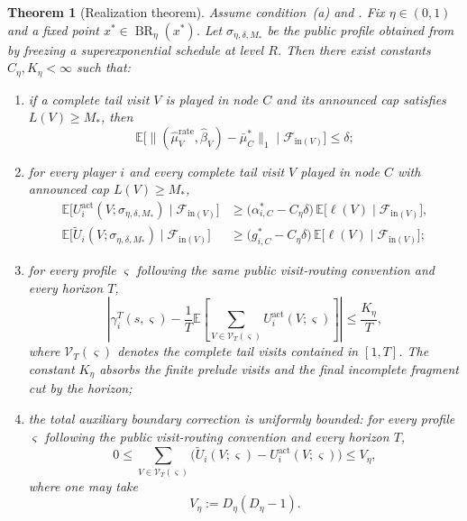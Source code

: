 \documentclass[12pt]{article}
\newtheorem{theorem}{Theorem}[section]
\theoremstyle{definition}
\newcommand{\E}{\mathbb{E}}
\newcommand{\1}{\mathbf{1}}
\newcommand{\cF}{\mathcal{F}}
\DeclareMathOperator{\BR}{BR}
\begin{document}
\begin{theorem}[Realization theorem]
\label{thm:realization}
Assume condition~\textnormal{(a)} and . Fix
$\eta\in(0,1)$ and a fixed point $x^*\in\BR_\eta(x^*)$. Let
$\sigma_{\eta,\delta,M_*}$ be the public profile obtained from
 by freezing a superexponential schedule at level $R$.
Then there exist constants $C_\eta,K_\eta<\infty$ such that:
\begin{enumerate}[label=\textnormal{(Q\arabic*)},leftmargin=2.8em]
\item if a complete tail visit $V$ is played in node $C$ and its announced cap
satisfies $L(V)\ge M_*$, then
\begin{equation}
\label{eq:visit-occupation-realization}
\E\bigl[\|(\widehat\mu_V^{\mathrm{rate}},\widehat\beta_V)-\bar\mu_C^*\|_1
\mid \cF_{\mathrm{in}(V)}\bigr]
\le \delta;
\end{equation}
\item for every player $i$ and every complete tail visit $V$ played in node $C$
with announced cap $L(V)\ge M_*$,
\begin{align}
\label{eq:visit-actual-realization}
\E\bigl[U_i^{\mathrm{act}}(V;\sigma_{\eta,\delta,M_*})\mid \cF_{\mathrm{in}(V)}\bigr]
&\ge
\bigl(\alpha_{i,C}^*-C_\eta\delta\bigr)\,
\E\bigl[\ell(V)\mid \cF_{\mathrm{in}(V)}\bigr],
\\
\label{eq:visit-aux-realization}
\E\bigl[\widetilde U_i(V;\sigma_{\eta,\delta,M_*})\mid \cF_{\mathrm{in}(V)}\bigr]
&\ge
\bigl(g_{i,C}^*-C_\eta\delta\bigr)\,
\E\bigl[\ell(V)\mid \cF_{\mathrm{in}(V)}\bigr];
\end{align}
\item for every profile $\varsigma$ following the same public visit-routing
convention and every horizon $T$,
\begin{equation}
\label{eq:realization-actual-tail-bound}
\left|
\gamma_i^T(s,\varsigma)
-
\frac1T\E\left[
\sum_{V\in\mathcal V_T(\varsigma)}
U_i^{\mathrm{act}}(V;\varsigma)
\right]
\right|
\le \frac{K_\eta}{T},
\end{equation}
where $\mathcal V_T(\varsigma)$ denotes the complete tail visits contained in
$[1,T]$. The constant $K_\eta$ absorbs the finite prelude visits and the final
incomplete fragment cut by the horizon;
\item the total auxiliary boundary correction is uniformly bounded:
for every profile $\varsigma$ following the public visit-routing convention and
every horizon $T$,
\begin{equation}
\label{eq:aux-actual-discrepancy}
0
\le
\sum_{V\in\mathcal V_T(\varsigma)}
\bigl(
\widetilde U_i(V;\varsigma)-U_i^{\mathrm{act}}(V;\varsigma)
\bigr)
\le
V_\eta,
\end{equation}
where one may take
\[
V_\eta:=D_\eta(D_\eta-1).
\]
\end{enumerate}
\end{theorem}
\end{document}
